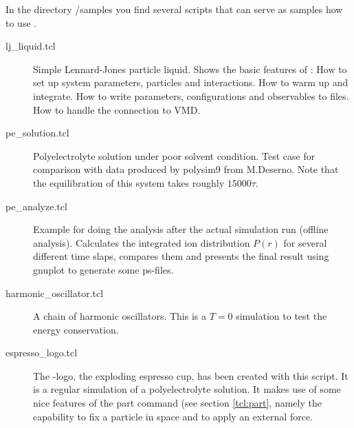 In the directory \es{}/samples you find several scripts that can serve
as samples how to use \es{}.
\begin{description}
\item[lj\_liquid.tcl] Simple Lennard-Jones particle liquid. Shows the
  basic features of \es: How to set up system parameters, particles
  and interactions. How to warm up and integrate. How to write
  parameters, configurations and observables to files. How to handle
  the connection to VMD.
\item[pe\_solution.tcl] Polyelectrolyte solution under poor solvent
  condition. Test case for comparison with data produced by polysim9
  from M.Deserno. Note that the equilibration of this system takes
  roughly $15000 \tau$.
\item[pe\_analyze.tcl] Example for doing the analysis after the actual
  simulation run (offline analysis). Calculates the integrated ion
  distribution $P(r)$ for several different time slaps, compares them
  and presents the final result using gnuplot to generate some
  ps-files.
\item[harmonic\_oscillator.tcl] A chain of harmonic oscillators. This
  is a $T=0$ simulation to test the energy conservation.
\item[espresso\_logo.tcl] The \es-logo, the exploding espresso cup,
  has been created with this script. It is a regular simulation of a
  polyelectrolyte solution. It makes use of some nice features of the
  part command (see section \vref{tcl:part}, namely the capability to
  fix a particle in space and to apply an external force.
\end{description}


